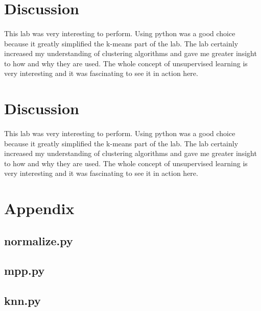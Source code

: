 \documentclass{article}
\begin{document}
\section*{Discussion}
\paragraph{}
This lab was very interesting to perform. Using python was a good
choice because it greatly simplified the k-means part of the lab.
The lab certainly increased my understanding of clustering algorithms 
and gave me greater insight to how and why they are used. The whole
concept of unsupervised learning is very interesting and it was fascinating
to see it in action here.
\newpage


\section*{Discussion}
\paragraph{}
This lab was very interesting to perform. Using python was a good
choice because it greatly simplified the k-means part of the lab.
The lab certainly increased my understanding of clustering algorithms 
and gave me greater insight to how and why they are used. The whole
concept of unsupervised learning is very interesting and it was fascinating
to see it in action here.
\newpage


\appendix
\section*{Appendix}
\subsection*{normalize.py}

\newpage
\subsection*{mpp.py}

\newpage
\subsection*{knn.py}

\newpage
\end{document}
